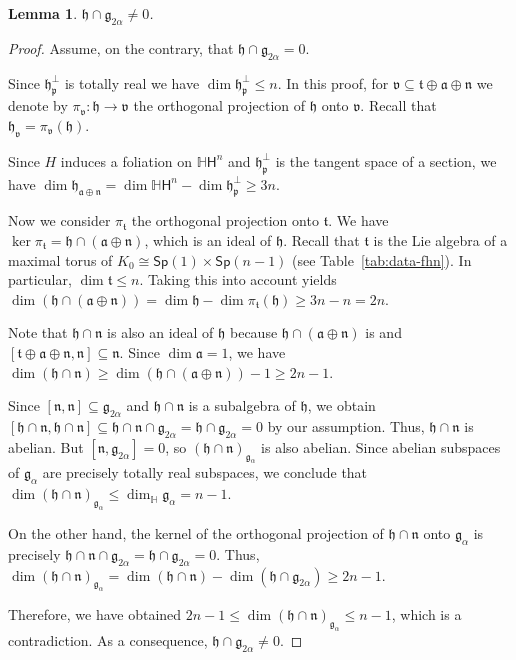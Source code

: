 \documentclass[12pt, a4paper]{amsart}
\newcommand{\g}{\mathfrak}
\newcommand{\s}{\mathsf}
\renewcommand{\H}{\mathbb{H}}
\newtheorem{lemma}[theorem]{Lemma}
\theoremstyle{definition}
\begin{document}
\begin{lemma}\label{lemma:vector-g2alpha}
$\g{h}\cap\g{g}_{2\alpha}\neq 0$.
\end{lemma}

\begin{proof}
Assume, on the contrary, that $\g{h}\cap\g{g}_{2\alpha}=0$.

Since $\g{h}_{\g{p}}^\perp$ is totally real we have $\dim\g{h}_{\g{p}}^\perp\leq n$.
In this proof, for $\g{v}\subseteq\g{t}\oplus\g{a}\oplus\g{n}$ 
we denote by $\pi_{\g{v}}\colon\g{h}\to\g{v}$ 
the orthogonal projection of $\g{h}$ onto $\g{v}$. 
Recall that $\g{h}_{\g{v}}=\pi_{\g{v}}(\g{h})$.

Since $H$ induces a foliation on $\H\s{H}^n$ and $\g{h}_{\g{p}}^\perp$ is the tangent space of a section, 
we have $\dim\g{h}_{\g{a}\oplus\g{n}}=\dim\H\s{H}^n-\dim\g{h}_{\g{p}}^\perp\geq 3n$.

Now we consider $\pi_{\g{t}}$ the orthogonal projection onto $\g{t}$.
We have $\ker\pi_{\g{t}}=\g{h}\cap(\g{a}\oplus\g{n})$, which is an ideal of $\g{h}$.
Recall that $\g{t}$ is the Lie algebra of a maximal torus of $K_0\cong\s{Sp}(1)\times\s{Sp}(n-1)$
(see Table~\ref{tab:data-fhn}).
In particular, $\dim\g{t}\leq n$.
Taking this into account yields 
$\dim(\g{h}\cap(\g{a}\oplus\g{n}))=\dim\g{h}-\dim\pi_{\g{t}}(\g{h})\geq 3n-n=2n$.

Note that $\g{h}\cap\g{n}$ is also an ideal of $\g{h}$ 
because $\g{h}\cap(\g{a}\oplus\g{n})$ is and
$[\g{t}\oplus\g{a}\oplus\g{n},\g{n}]\subseteq\g{n}$.
Since $\dim\g{a}=1$, 
we have $\dim(\g{h}\cap\g{n})\geq\dim(\g{h}\cap(\g{a}\oplus\g{n}))-1\geq 2n-1$.

Since $[\g{n},\g{n}]\subseteq\g{g}_{2\alpha}$ and $\g{h}\cap\g{n}$ is a subalgebra of $\g{h}$, 
we obtain $[\g{h}\cap\g{n},\g{h}\cap\g{n}]\subseteq\g{h}\cap\g{n}\cap\g{g}_{2\alpha}=\g{h}\cap\g{g}_{2\alpha}=0$ 
by our assumption.
Thus, $\g{h}\cap\g{n}$ is abelian.
But $[\g{n},\g{g}_{2\alpha}]=0$, so $(\g{h}\cap\g{n})_{\g{g}_\alpha}$ is also abelian.
Since abelian subspaces of $\g{g}_\alpha$ are precisely totally real subspaces, we conclude that $\dim(\g{h}\cap\g{n})_{\g{g}_\alpha}\leq \dim_{\H}\g{g}_\alpha=n-1$.

On the other hand, the kernel of the orthogonal projection of 
$\g{h}\cap\g{n}$ onto $\g{g}_\alpha$ is precisely $\g{h}\cap\g{n}\cap\g{g}_{2\alpha}=\g{h}\cap\g{g}_{2\alpha}=0$.
Thus, $\dim(\g{h}\cap\g{n})_{\g{g}_\alpha}=\dim(\g{h}\cap\g{n})-\dim(\g{h}\cap\g{g}_{2\alpha})\geq 2n-1$.

Therefore, we have obtained $2n-1\leq\dim(\g{h}\cap\g{n})_{\g{g}_\alpha}\leq n-1$, which is a contradiction.
As a consequence, $\g{h}\cap\g{g}_{2\alpha}\neq 0$.
\end{proof}
\end{document}
